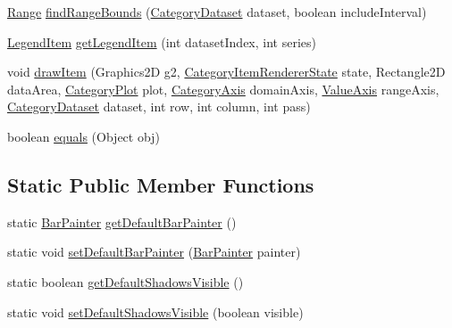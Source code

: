 \begin{DoxyCompactItemize}
\mbox{\hyperlink{classorg_1_1jfree_1_1data_1_1_range}{Range}} \mbox{\hyperlink{classorg_1_1jfree_1_1chart_1_1renderer_1_1category_1_1_bar_renderer_acefcd84f3bd182d59b3e141588643ea4}{find\+Range\+Bounds}} (\mbox{\hyperlink{interfaceorg_1_1jfree_1_1data_1_1category_1_1_category_dataset}{Category\+Dataset}} dataset, boolean include\+Interval)
\item 
\mbox{\hyperlink{classorg_1_1jfree_1_1chart_1_1_legend_item}{Legend\+Item}} \mbox{\hyperlink{classorg_1_1jfree_1_1chart_1_1renderer_1_1category_1_1_bar_renderer_a30254dc9cccaf5d15872a760965f7a9d}{get\+Legend\+Item}} (int dataset\+Index, int series)
\item 
void \mbox{\hyperlink{classorg_1_1jfree_1_1chart_1_1renderer_1_1category_1_1_bar_renderer_a74f40fee8f84468ef4b3d2ecd59659f3}{draw\+Item}} (Graphics2D g2, \mbox{\hyperlink{classorg_1_1jfree_1_1chart_1_1renderer_1_1category_1_1_category_item_renderer_state}{Category\+Item\+Renderer\+State}} state, Rectangle2D data\+Area, \mbox{\hyperlink{classorg_1_1jfree_1_1chart_1_1plot_1_1_category_plot}{Category\+Plot}} plot, \mbox{\hyperlink{classorg_1_1jfree_1_1chart_1_1axis_1_1_category_axis}{Category\+Axis}} domain\+Axis, \mbox{\hyperlink{classorg_1_1jfree_1_1chart_1_1axis_1_1_value_axis}{Value\+Axis}} range\+Axis, \mbox{\hyperlink{interfaceorg_1_1jfree_1_1data_1_1category_1_1_category_dataset}{Category\+Dataset}} dataset, int row, int column, int pass)
\item 
boolean \mbox{\hyperlink{classorg_1_1jfree_1_1chart_1_1renderer_1_1category_1_1_bar_renderer_abee2a1c549d7f3c9595084ef361b5b6b}{equals}} (Object obj)
\end{DoxyCompactItemize}
\subsection*{Static Public Member Functions}
\begin{DoxyCompactItemize}
\item 
static \mbox{\hyperlink{interfaceorg_1_1jfree_1_1chart_1_1renderer_1_1category_1_1_bar_painter}{Bar\+Painter}} \mbox{\hyperlink{classorg_1_1jfree_1_1chart_1_1renderer_1_1category_1_1_bar_renderer_af2dd1659f4be5ee58d38e592f086073c}{get\+Default\+Bar\+Painter}} ()
\item 
static void \mbox{\hyperlink{classorg_1_1jfree_1_1chart_1_1renderer_1_1category_1_1_bar_renderer_aa5b8c4d29322deb81eaec4377c2dd2a6}{set\+Default\+Bar\+Painter}} (\mbox{\hyperlink{interfaceorg_1_1jfree_1_1chart_1_1renderer_1_1category_1_1_bar_painter}{Bar\+Painter}} painter)
\item 
static boolean \mbox{\hyperlink{classorg_1_1jfree_1_1chart_1_1renderer_1_1category_1_1_bar_renderer_a0aabafc66981c21dd8fa5b98193d5a9d}{get\+Default\+Shadows\+Visible}} ()
\item 
static void \mbox{\hyperlink{classorg_1_1jfree_1_1chart_1_1renderer_1_1category_1_1_bar_renderer_a32e4bfa8e107485211713f9543c48302}{set\+Default\+Shadows\+Visible}} (boolean visible)
\end{DoxyCompactItemize}
